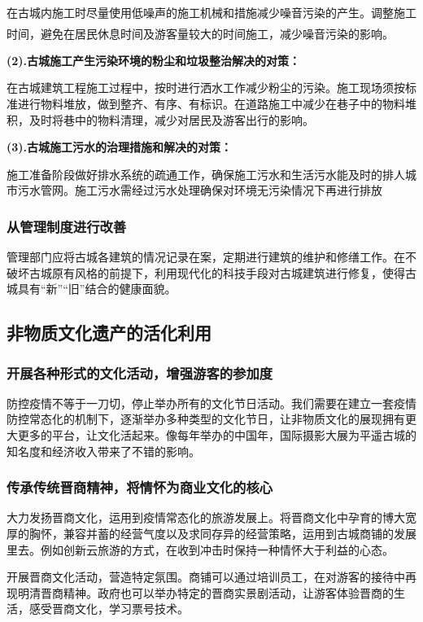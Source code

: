 \documentclass[UTF8]{ctexart}
\newcommand{\upcite}[1]{\textsuperscript{\textsuperscript{\cite{#1}}}}
\begin{document}
在古城内施工时尽量使用低噪声的施工机械和措施减少噪音污染的产生。调整施工时间，避免在居民休息时间及游客量较大的时间施工，减少噪音污染的影响。\upcite{林哲宇2017浅析建筑施工中的施工环境污染问题与防治策略}

\textbf{(2).古城施工产生污染环境的粉尘和垃圾整治解决的对策：}

在古城建筑工程施工过程中，按时进行洒水工作减少粉尘的污染。施工现场须按标准进行物料堆放，做到整齐、有序、有标识。在道路施工中减少在巷子中的物料堆积，及时将巷中的物料清理，减少对居民及游客出行的影响。

\textbf{(3).古城施工污水的治理措施和解决的对策：}

施工准备阶段做好排水系统的疏通工作，确保施工污水和生活污水能及时的排人城市污水管网。施工污水需经过污水处理确保对环境无污染情况下再进行排放
        \subsubsection{从管理制度进行改善}
管理部门应将古城各建筑的情况记录在案，定期进行建筑的维护和修缮工作。在不破坏古城原有风格的前提下，利用现代化的科技手段对古城建筑进行修复，使得古城具有“新”“旧”结合的健康面貌。

    \subsection{非物质文化遗产的活化利用}
        \subsubsection{开展各种形式的文化活动，增强游客的参加度}
防控疫情不等于一刀切，停止举办所有的文化节日活动。我们需要在建立一套疫情防控常态化的机制下，逐渐举办多种类型的文化节日，让非物质文化的展现拥有更大更多的平台，让文化活起来。像每年举办的中国年，国际摄影大展为平遥古城的知名度和经济收入带来了不错的影响。
        \subsubsection{传承传统晋商精神，将情怀为商业文化的核心}
大力发扬晋商文化，运用到疫情常态化的旅游发展上。将晋商文化中孕育的博大宽厚的胸怀，兼容并蓄的经营气度以及求同存异的经营策略，运用到古城商铺的发展里去。例如创新云旅游的方式，在收到冲击时保持一种情怀大于利益的心态。

开展晋商文化活动，营造特定氛围。商铺可以通过培训员工，在对游客的接待中再现明清晋商精神。政府也可以举办特定的晋商实景剧活动，让游客体验晋商的生活，感受晋商文化，学习票号技术。
\end{document}
